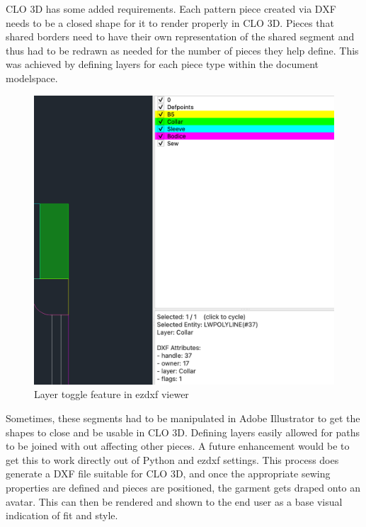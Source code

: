 CLO 3D has some added requirements. Each pattern piece created via DXF needs to be a closed shape for it to render properly in CLO 3D. Pieces that shared borders need to have their own representation of the shared segment and thus had to be redrawn as needed for the number of pieces they help define. This was achieved by defining layers for each piece type within the document modelspace.

\begin{figure} [H] %
    \centering %
    \includegraphics[width = \textwidth]{Images/dxf viewer.png} %
    \caption{Layer toggle feature in ezdxf viewer}
    \label{} %
\end{figure}

Sometimes, these segments had to be manipulated in Adobe Illustrator to get the shapes to close and be usable in CLO 3D. Defining layers easily allowed for paths to be joined with out affecting other pieces. A future enhancement would be to get this to work directly out of Python and ezdxf settings. This process does generate a DXF file suitable for CLO 3D, and once the appropriate sewing properties are defined and pieces are positioned, the garment gets draped onto an avatar. This can then be rendered and shown to the end user as a base visual indication of fit and style.

